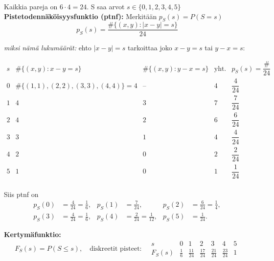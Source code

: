 \documentclass[12pt,a4paper]{article}
\begin{document}
Kaikkia pareja on $6\cdot 4=24$. S saa arvot $s\in\{0,1,2,3,4,5\}$\\

\textbf{Pistetodennäköisyysfunktio (ptnf):}
Merkitään $p_S(s)=P(S=s)$
\[
p_S(s)=\frac{\#\{(x,y):|x-y|=s\}}{24}
\]

\emph{miksi nämä lukumäärät:} 
ehto $|x-y|=s$ tarkoittaa joko $x-y=s$ tai $y-x=s$:

{\small
\[
\begin{array}{c|c|c|c|c}
s & \#\{(x,y):x-y=s\} & \#\{(x,y):y-x=s\} & \text{yht.} & p_S(s)=\dfrac{\#}{24} \\\hline
0 & \#\{(1,1),(2,2),(3,3),(4,4)\}=4 & \text{--} & 4 & \dfrac{4}{24} \\
1 & 4 & 3 & 7 & \dfrac{7}{24} \\
2 & 4 & 2 & 6 & \dfrac{6}{24} \\
3 & 3 & 1 & 4 & \dfrac{4}{24} \\
4 & 2 & 0 & 2 & \dfrac{2}{24} \\
5 & 1 & 0 & 1 & \dfrac{1}{24} \\
\end{array}
\]
}

Siis ptnf on
\[
\begin{aligned}
p_S(0)&=\tfrac{4}{24}=\tfrac{1}{6},&
p_S(1)&=\tfrac{7}{24},&
p_S(2)&=\tfrac{6}{24}=\tfrac{1}{4},\\
p_S(3)&=\tfrac{4}{24}=\tfrac{1}{6},&
p_S(4)&=\tfrac{2}{24}=\tfrac{1}{12},&
p_S(5)&=\tfrac{1}{24}.
\end{aligned}
\]

\textbf{Kertymäfunktio:}
\[
F_S(s)=P(S\le s),\quad \text{diskreetit pisteet:}\quad
\begin{array}{c|cccccc}
s & 0 & 1 & 2 & 3 & 4 & 5\\\hline
F_S(s) & \tfrac{1}{6} & \tfrac{11}{24} & \tfrac{17}{24} & \tfrac{21}{24} & \tfrac{23}{24} & 1
\end{array}
\]
\pagebreak
\end{document}
